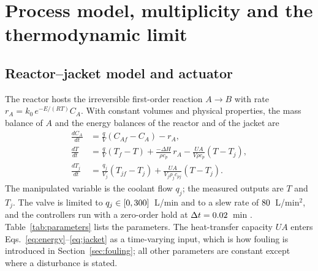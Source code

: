 \section{Process model, multiplicity and the thermodynamic limit}
\label{sec:model}

\subsection{Reactor--jacket model and actuator}
The reactor hosts the irreversible first-order reaction $A\rightarrow B$ with rate $r_A=k_0\,e^{-E/(RT)}C_A$. With constant volumes and physical properties, the mass balance of $A$ and the energy balances of the reactor and of the jacket are
\begin{align}
\frac{dC_A}{dt} &= \frac{q}{V}\left(C_{Af}-C_A\right) - r_A, \label{eq:mass}\\
\frac{dT}{dt} &= \frac{q}{V}\left(T_f-T\right) + \frac{-\Delta H}{\rho c_p}\,r_A - \frac{UA}{V\rho c_p}\left(T-T_j\right), \label{eq:energy}\\
\frac{dT_j}{dt} &= \frac{q_j}{V_j}\left(T_{jf}-T_j\right) + \frac{UA}{V_j\rho_j c_{pj}}\left(T-T_j\right). \label{eq:jacket}
\end{align}
The manipulated variable is the coolant flow $q_j$; the measured outputs are $T$ and $T_j$. The valve is limited to $q_j\in[0,300]$~L/min and to a slew rate of $80$~L/min$^2$, and the controllers run with a zero-order hold at $\Delta t=0.02$~min \cite{hippe2006windup,tarbouriech2009antiwindup,choudhury2005modelling}. Table~\ref{tab:parameters} lists the parameters. The heat-transfer capacity $UA$ enters Eqs.~\eqref{eq:energy}--\eqref{eq:jacket} as a time-varying input, which is how fouling is introduced in Section~\ref{sec:fouling}; all other parameters are constant except where a disturbance is stated.



